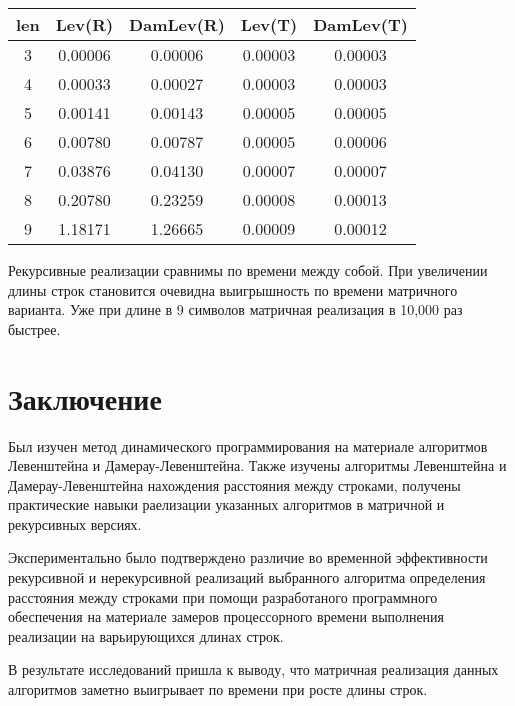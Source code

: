 \documentclass[12pt]{report}
\begin{document}
\begin{center}
	\begin{tabular}{|c c c c c|} 
 	\hline
	len & Lev(R) & DamLev(R) & Lev(T) & DamLev(T) \\ [0.5ex] 
 	\hline\hline
 	3 & 0.00006 & 0.00006 & 0.00003 & 0.00003\\
 	\hline
 	4 & 0.00033 & 0.00027 & 0.00003 & 0.00003\\
 	\hline
	5 & 0.00141 & 0.00143 & 0.00005 & 0.00005\\
	\hline
	6 & 0.00780 & 0.00787 & 0.00005 & 0.00006\\
	\hline
	7 & 0.03876 & 0.04130 & 0.00007 & 0.00007\\
	\hline
	8 & 0.20780 & 0.23259 & 0.00008 & 0.00013\\
	\hline
	9 & 1.18171 & 1.26665 & 0.00009 & 0.00012\\
	\hline
	\end{tabular}
\end{center}







\par
Рекурсивные реализации сравнимы по времени между собой. При увеличении длины строк становится очевидна выигрышность по времени матричного варианта. Уже при длине в 9 символов матричная реализация в 10,000 раз быстрее.

\chapter*{Заключение}
Был изучен метод динамического программирования на материале алгоритмов Левенштейна и Дамерау-Левенштейна.
Также изучены алгоритмы Левенштейна и Дамерау-Левенштейна нахождения расстояния между строками, получены практические навыки раелизации указанных алгоритмов
в матричной  и рекурсивных версиях. 

Экспериментально было подтверждено различие во временной эффективности рекурсивной и нерекурсивной реализаций выбранного алгоритма определения расстояния между строками при помощи разработаного программного обеспечения на материале замеров процессорного времени выполнения реализации на варьирующихся длинах строк. 

В результате исследований пришла к выводу, что матричная реализация данных алгоритмов заметно выигрывает по времени при росте длины строк.
\end{document}
